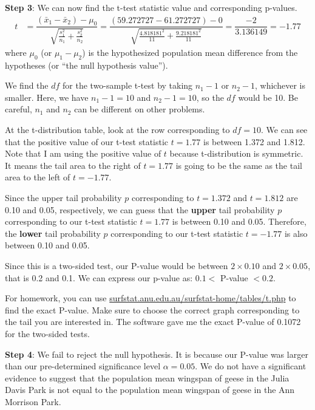 \documentclass[12pt]{article}
\begin{document}
\noindent \textbf{Step 3}: We can now find the t-test statistic value and corresponding p-values.
\begin{align*}
t &= \dfrac{(\bar{x}_1 - \bar{x}_2) - \mu_0}{\sqrt{\frac{s_1^2}{n_1} + \frac{s_2^2}{n_2}}} = \dfrac{(59.272727 - 61.272727) - 0}{\sqrt{\frac{4.818181^2}{11} + \frac{9.218181^2}{11}}} = \dfrac{-2}{3.136149} = -1.77
\end{align*}
where $\mu_0$ (or $\mu_1 - \mu_2$) is the hypothesized population mean difference from the hypotheses (or ``the null hypothesis value'').

We find the $df$ for the two-sample t-test by taking $n_1 - 1$ or $n_2 - 1$, whichever is smaller. Here, we have $n_1 - 1 = 10$ and $n_2 - 1 = 10$, so the $df$ would be 10. Be careful, $n_1$ and $n_2$ can be different on other problems.

At the t-distribution table, look at the row corresponding to $df = 10$. We can see that the positive value of our t-test statistic $t = 1.77$ is between 1.372 and 1.812. Note that I am using the positive value of $t$ because t-distribution is symmetric. It means the tail area to the right of $t = 1.77$ is going to be the same as the tail area to the left of $t = -1.77$. 

Since the upper tail probability $p$ corresponding to $t = 1.372$ and $t = 1.812$ are 0.10 and 0.05, respectively, we can guess that the \textbf{upper} tail probability $p$ corresponding to our t-test statistic $t = 1.77$ is between 0.10 and 0.05. Therefore, the \textbf{lower} tail probability $p$ corresponding to our t-test statistic $t = -1.77$ is also between 0.10 and 0.05.

Since this is a two-sided test, our P-value would be between $2 \times 0.10$ and $2 \times 0.05$, that is 0.2 and 0.1. We can express our p-value as: $0.1 <$ P-value $< 0.2$.

For homework, you can use \url{surfstat.anu.edu.au/surfstat-home/tables/t.php} to find the exact P-value. Make sure to choose the correct graph corresponding to the tail you are interested in. The software gave me the exact P-value of 0.1072 for the two-sided tests.

\noindent \textbf{Step 4}: We fail to reject the null hypothesis. It is because our P-value was larger than our pre-determined significance level $\alpha = 0.05$. We do not have a significant evidence to suggest that the population mean wingspan of geese in the Julia Davis Park is not equal to the population mean wingspan of geese in the Ann Morrison Park.
\end{document}
